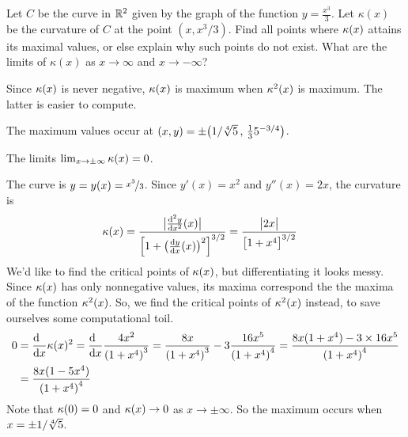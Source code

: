 \begin{question}[M317 2011D]  %
Let $C$ be the curve in $\mathbb{R}^2$ given by the graph of the function
$y=\frac{x^3}{3}$. Let $\kappa(x)$ be the curvature of $C$ at the point 
$(x, x^3/3)$. Find all points where $\kappa(x)$ attains its maximal values,
or else explain why such points do not exist. What are the limits of 
$\kappa(x)$ as $x \rightarrow \infty$ and
$x \rightarrow -\infty$?
\end{question}

\begin{hint} 
Since $\kappa(x)$ is never negative, $\kappa(x)$ is maximum when $\kappa^2(x)$ is maximum. The latter is easier to compute.
\end{hint}

\begin{answer} 
The maximum values occur at $(x,y)=\pm \big(1/\root{4}\of{5}\,,\,
                 \frac{1}{3}5^{-3/4}\big)$.

The limits $\lim_{x\rightarrow\pm\infty}\kappa(x) = 0$.
\end{answer}

\begin{solution} 
The curve is $y=y(x)=\nicefrac{x^3}{3}$. Since $y'(x) = x^2$ and
$y''(x) = 2x$, the curvature is
\begin{align*}
\ka(x)
&=\frac{\big|\difftwo{y}{x}(x)\big|}
  {\Big[1+\big(\diff{y}{x}(x)\big)^2\Big]^{3/2}}
=\frac{\big|2x\big|}
  {\big[1+x^4\big]^{3/2}}
\end{align*}
 We'd like to find the critical points of $\kappa(x)$, but differentiating it looks messy. Since $\kappa(x)$ has only nonnegative values, its maxima correspond the the maxima of the function $\kappa^2(x)$. So, we find the critical points of $\kappa^2(x)$ instead, to save ourselves some computational toil.
\begin{align*}
0&=\diff{\hfill}{x}\ka(x)^2
=\diff{\hfill}{x}\frac{4x^2}{{(1+x^4)}^3}
=\frac{8x}{{(1+x^4)}^3} - 3\frac{16x^5}{{(1+x^4)}^4}
=\frac{8x(1+x^4)-3\times 16x^5}{{(1+x^4)}^4} \\
&=\frac{8x(1-5x^4)}{{(1+x^4)}^4}
\end{align*}
Note that $\kappa(0)=0$ and $\kappa(x)\rightarrow 0$ as $x\rightarrow\pm \infty$.
So the maximum occurs when $x=\pm 1/\root{4}\of{5}$.
\end{solution}



